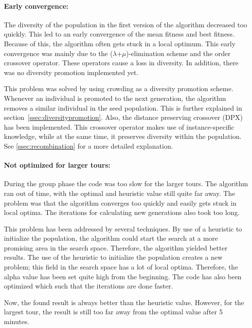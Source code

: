 \documentclass[a4paper,10pt]{article}
\begin{document}
\paragraph{Early convergence:} The diversity of the population in the first version of the algorithm decreased too quickly. This led to an early convergence of the mean fitness and best fitness. Because of this, the algorithm often gets stuck in a local optimum. This early convergence was mainly due to the ($\lambda$+$\mu$)-elimination scheme and the order crossover operator. These operators cause a loss in diversity. In addition, there was no diversity promotion implemented yet.

This problem was solved by using crowding as a diversity promotion scheme. Whenever an individual is promoted to the next generation, the algorithm removes a similar individual in the seed population. This is further explained in section~\ref{ssec:diversitypromotion}. Also, the distance preserving crossover (DPX) has been implemented. This crossover operator makes use of instance-specific knowledge, while at the same time, it preserves diversity within the population. See \ref{ssec:recombination} for a more detailed explanation. 

\paragraph{Not optimized for larger tours:} During the group phase the code was too slow for the larger tours. The algorithm ran out of time, with the optimal and heuristic value still quite far away. The problem was that the algorithm converges too quickly and easily gets stuck in local optima. The iterations for calculating new generations also took too long. 

This problem has been addressed by several techniques. By use of a heuristic to initialize the population, the algorithm could start the search at a more promising area in the search space. Therefore, the algorithm yielded better results. The use of the heuristic to initialize the population creates a new problem; this field in the search space has a lot of local optima. Therefore, the alpha value has been set quite high from the beginning. The code has also been optimized which such that the iterations are done faster.

Now, the found result is always better than the heuristic value. However, for the largest tour, the result is still too far away from the optimal value after 5 minutes. 
\end{document}
